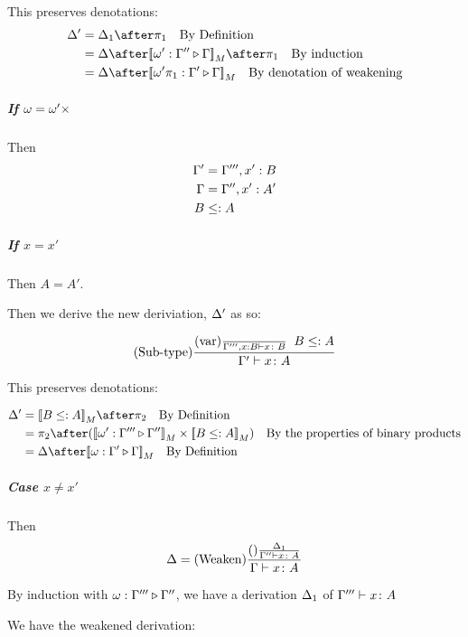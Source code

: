 {        This preserves denotations:
        \begin{align}
            \D' & = \D_1\after\p\qt{By Definition} \\
            & = \D\after\deno{\wrel{\w'}{\G''}{\G}}\after\p\qt{By induction}\\
            & = \D\after\deno{\wrel{\w'\p}{\G'}{\G}}\qt{By denotation of weakening}
        \end{align}

        \subparagraph{If $\omega = \omega'\times$} 
        Then 
        \begin{align}
            \Gamma' & = \Gamma''', x': B\\
            \Gamma &= \Gamma'', x': A'\\
            B & \leq: A
        \end{align}

        \subparagraph{If $x = x'$}

        Then $A = A'$.

        Then we derive the new deriviation, $\Delta'$ as so:

        \begin{equation}
            (\text{Sub-type}) \frac{
                (\text{var}) \frac{}{\Gamma''', x: B \vdash x \colon B}
                \;\;
                B \leq: A
            }{
                \Gamma' \vdash x \colon A
            }
        \end{equation}

        This preserves denotations:

        \begin{align}
            \D' & = \deno{B\subtype A}\after\pp\qt{By Definition} \\
             & = \pp\after (\deno{\wrel{\w'}{\G'''}{\G''}}\times \deno{B\subtype A}) \qt{By the properties of binary products}\\
             & = \D\after\deno{\wrel{\w}{\G'}{\G}}\qt{By Definition}
        \end{align}

        \subparagraph{Case $x \neq x'$}
        Then 
        \begin{equation}
            \Delta = (\text{Weaken}) \frac{(\text{}) \frac{\Delta_1}{\Gamma'' \vdash x \colon A}}{\Gamma \vdash x \colon A}
        \end{equation}

        By induction with $\omega : \Gamma''' \triangleright \Gamma''$,
         we have a derivation $\Delta_1$ of $\Gamma''' \vdash x \colon A$

        We have the weakened derivation:

}
